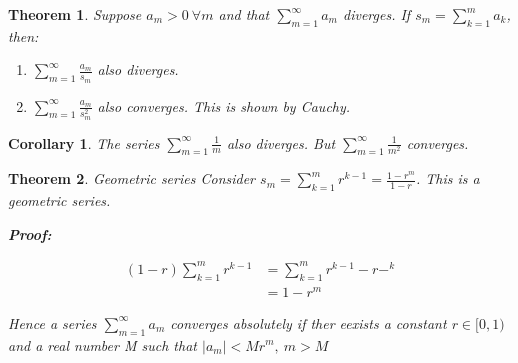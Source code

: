 \documentclass{article}
\newtheorem{theorem}{Theorem}[section]
\newtheorem{corollary}{Corollary}
\theoremstyle{definition}
\begin{document}
\begin{theorem}
Suppose $a_m>0\ \forall m$ and that $\sum_{m=1}^{\infty} a_m$ diverges. If $s_m = \sum_{k=1}^m a_k$, then:
\begin{enumerate}
	\item $\sum_{m=1}^{\infty} \frac{a_m}{s_m}$ also diverges.
	\item $\sum_{m=1}^{\infty} \frac{a_m}{s_m^2}$ also converges. This is shown by Cauchy. 
\end{enumerate}
\end{theorem}

\begin{corollary}
The series 	$\sum_{m=1}^{\infty} \frac{1}{m}$ also diverges. But $\sum_{m=1}^{\infty} \frac{1}{m^2}$ converges.
\end{corollary}

\begin{theorem}Geometric series
Consider $s_m = \sum_{k=1}^m r^{k-1} = \frac{1-r^m}{1-r}$. This is a geometric series.  

\textbf{Proof:}

\begin{align}
(1-r)\sum_{k=1}^m r^{k-1} &= \sum_{k=1}^m r^{k-1} - r-^k \\ 	
& = 1-r^m
\end{align}

Hence a series $\sum_{m=1}^\infty a_m$ converges absolutely if ther eexists a constant $r \in [0,1)$ and a real number M such that $|a_m| < M r^m,\ m>M$
\end{theorem}
\end{document}

